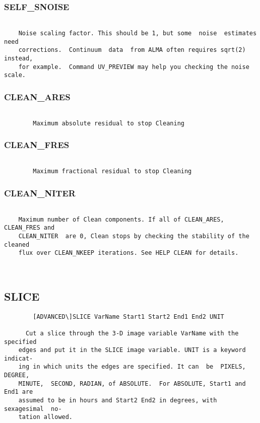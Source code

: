 \subsubsection{SELF\_SNOISE}
\begin{verbatim}

    Noise scaling factor. This should be 1, but some  noise  estimates  need
    corrections.  Continuum  data  from ALMA often requires sqrt(2) instead,
    for example.  Command UV_PREVIEW may help you checking the noise scale.

\end{verbatim}
\subsubsection{CLEAN\_ARES}
\begin{verbatim}

        Maximum absolute residual to stop Cleaning

\end{verbatim}
\subsubsection{CLEAN\_FRES}
\begin{verbatim}

        Maximum fractional residual to stop Cleaning

\end{verbatim}
\subsubsection{CLEAN\_NITER}
\begin{verbatim}

    Maximum number of Clean components. If all of CLEAN_ARES, CLEAN_FRES and
    CLEAN_NITER  are 0, Clean stops by checking the stability of the cleaned
    flux over CLEAN_NKEEP iterations. See HELP CLEAN for details.



\end{verbatim}
\subsection{SLICE}
\begin{verbatim}
        [ADVANCED\]SLICE VarName Start1 Start2 End1 End2 UNIT

      Cut a slice through the 3-D image variable VarName with the  specified
    edges and put it in the SLICE image variable. UNIT is a keyword indicat-
    ing in which units the edges are specified. It can  be  PIXELS,  DEGREE,
    MINUTE,  SECOND, RADIAN, of ABSOLUTE.  For ABSOLUTE, Start1 and End1 are
    assumed to be in hours and Start2 End2 in degrees, with sexagesimal  no-
    tation allowed.

\end{verbatim}
